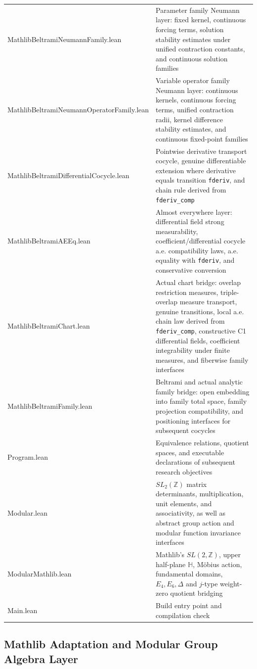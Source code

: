 \documentclass[UTF8,a4paper,11pt]{article}
\begin{document}
\begin{center}
\begin{tabularx}{\textwidth}{>{\ttfamily}lX}
MathlibBeltramiNeumannFamily.lean & Parameter family Neumann layer: fixed kernel, continuous forcing terms, solution stability estimates under unified contraction constants, and continuous solution families \\
MathlibBeltramiNeumannOperatorFamily.lean & Variable operator family Neumann layer: continuous kernels, continuous forcing terms, unified contraction radii, kernel difference stability estimates, and continuous fixed-point families \\
MathlibBeltramiDifferentialCocycle.lean & Pointwise derivative transport cocycle, genuine differentiable extension where derivative equals transition \texttt{fderiv}, and chain rule derived from \texttt{fderiv\_comp} \\
MathlibBeltramiAEEq.lean & Almost everywhere layer: differential field strong measurability, coefficient/differential cocycle a.e. compatibility laws, a.e. equality with \texttt{fderiv}, and conservative conversion \\
MathlibBeltramiChart.lean & Actual chart bridge: overlap restriction measures, triple-overlap measure transport, genuine transitions, local a.e. chain law derived from \texttt{fderiv\_comp}, constructive C1 differential fields, coefficient integrability under finite measures, and fiberwise family interfaces \\
MathlibBeltramiFamily.lean & Beltrami and actual analytic family bridge: open embedding into family total space, family projection compatibility, and positioning interfaces for subsequent cocycles \\
Program.lean & Equivalence relations, quotient spaces, and executable declarations of subsequent research objectives \\
Modular.lean & $SL_2(\mathbb Z)$ matrix determinants, multiplication, unit elements, and associativity, as well as abstract group action and modular function invariance interfaces \\
ModularMathlib.lean & Mathlib's $SL(2,\mathbb Z)$, upper half-plane $\mathbb H$, Möbius action, fundamental domains, $E_4,E_6,\Delta$ and $j$-type weight-zero quotient bridging \\
Main.lean & Build entry point and compilation check \\
\bottomrule
\end{tabularx}
\normalsize
\end{center}

\subsection{Mathlib Adaptation and Modular Group Algebra Layer}
\end{document}
